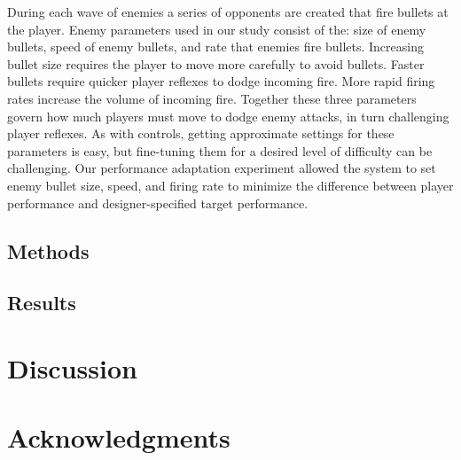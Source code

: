 \documentclass[letterpaper]{article}
\begin{document}
During each wave of enemies a series of opponents are created that fire bullets at the player. Enemy parameters used in our study consist of the: size of enemy bullets, speed of enemy bullets, and rate that enemies fire bullets. Increasing bullet size requires the player to move more carefully to avoid bullets. Faster bullets require quicker player reflexes to dodge incoming fire. More rapid firing rates increase the volume of incoming fire. Together these three parameters govern how much players must move to dodge enemy attacks, in turn challenging player reflexes. As with controls, getting approximate settings for these parameters is easy, but fine-tuning them for a desired level of difficulty can be challenging. Our performance adaptation experiment allowed the system to set enemy bullet size, speed, and firing rate to minimize the difference between player performance and designer-specified target performance.


\subsection{Methods}



\subsection{Results}

\section{Discussion}




\section{Acknowledgments}



\end{document}
